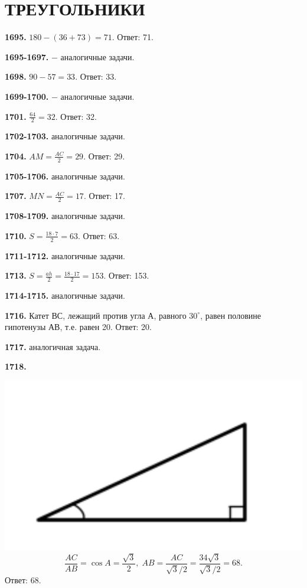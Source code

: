 \section{ТРЕУГОЛЬНИКИ}

\textbf{1695.}  $180-(36+73)=71.$  \newline \null \hfill  Ответ: 71.

\textbf{1695-1697.}  $-$ аналогичные задачи. 

\textbf{1698.} $90-57=33.$ \newline \null \hfill Ответ: 33. 

\textbf{1699-1700.}  $-$ аналогичные задачи. 

\textbf{1701.} $\frac{64}{2} = 32.$ \newline \null \hfill Ответ: 32.

\textbf{1702-1703.} аналогичные задачи.

\textbf{1704.} $AM = \frac{AC}{2} = 29$. \newline \null \hfill Ответ: 29.

\textbf{1705-1706.} аналогичные задачи.

\textbf{1707.} $MN = \frac{AC}{2} = 17.$ \newline \null \hfill Ответ: 17.

\textbf{1708-1709.} аналогичные задачи.

\textbf{1710.} $S = \frac{18 \cdot 7}{2} = 63$. \newline \null \hfill Ответ: 63.

\textbf{1711-1712.} аналогичные задачи.

\textbf{1713.} $S = \frac{ah}{2} = \frac{18 \cdot 17}{2} = 153$. \newline \null \hfill Ответ: 153.

\textbf{1714-1715.} аналогичные задачи.

\textbf{1716.} Катет $ВС$, лежащий против угла $А$, равного $30^\circ$, равен половине гипотенузы $АВ$, т.е. равен 20. 
\newline \null \hspace*{\fill} Ответ: 20.

\textbf{1717.} аналогичная задача.

\clearpage

\textbf{1718.} 

{\centering \includegraphics[width=0.4\linewidth]{Geometry/Content/1.png}
\[
\frac{AC}{AB} = \cos{A} = \frac{\sqrt{3}}{2}, \; AB = \frac{AC}{\sqrt{3} / 2} = \frac{34 \sqrt{3}}{\sqrt{3} / 2} = 68.
\]
\newline \null \hspace*{\fill} Ответ: 68.
}

